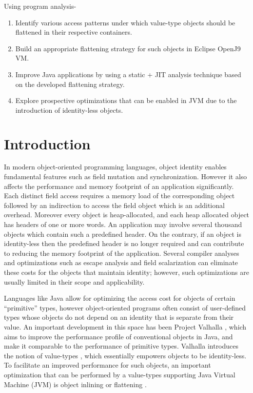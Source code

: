 \documentclass[12 pt, a4paper]{article}
\begin{document}
Using program analysis-
\begin{enumerate}
\item Identify various access patterns under which value-type objects should be flattened in their respective containers.
\item Build an appropriate flattening strategy for such objects in Eclipse OpenJ9 VM.
\item Improve Java applications by using a static + JIT analysis technique based on the developed flattening strategy.
\item Explore prospective optimizations that can be enabled in JVM due to the introduction of identity-less objects.

\end{enumerate} 

\section{Introduction}
In modern object-oriented programming languages, object identity
enables fundamental features such as field mutation and synchronization.
However it also affects the performance and memory footprint of an application significantly. 
Each distinct field access requires a memory load of the corresponding object followed by an 
indirection to access the field object which is an additional overhead.
Moreover every object is heap-allocated, and each heap allocated object has headers of one or 
more words. An application may involve several 
thousand objects which contain such a predefined header. On the contrary, if an object is 
identity-less then the predefined header is no longer required and can contribute to reducing the 
memory footprint of the application.  Several compiler
analyses and optimizations such as escape analysis and field scalarization can eliminate 
these costs for the objects that maintain identity; however,
such optimizations are usually limited in their scope and applicability.


	Languages like Java allow for optimizing the access cost for
objects of certain “primitive” types, however object-oriented programs often
consist of user-defined types whose objects do not depend
on an identity that is separate from their value. An important
development in this space has been Project Valhalla \citep{PV}, which
aims to improve the performance profile of conventional objects in
Java, and make it comparable to the performance of primitive types.
Valhalla introduces the notion of value-types \citep{JEPD}, which essentially
empowers objects to be identity-less. To facilitate an improved 
performance for such objects, an important optimization
that can be performed by a value-types supporting Java Virtual
Machine (JVM) is object inlining or flattening \citep{ObjectInlining}.
\end{document}
